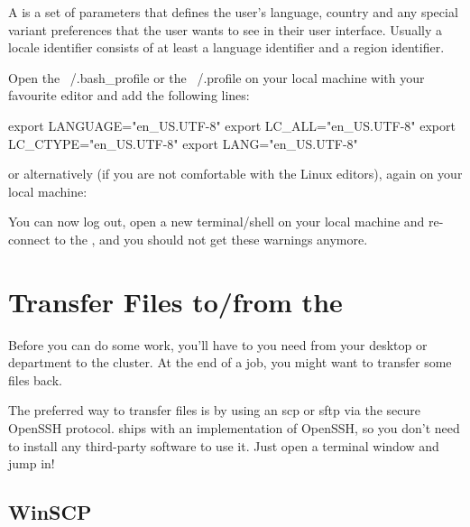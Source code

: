 A  is a set of parameters that defines the user's language,
country and any special variant preferences that the user wants to see in their
user interface. Usually a locale identifier consists of at least a language
identifier and a region identifier.

\ifmacORlinux
Open the ~/.bash\_profile or the ~/.profile on your local machine with your
favourite editor and add the following lines:

\begin{prompt}
export LANGUAGE="en_US.UTF-8"
export LC_ALL="en_US.UTF-8"
export LC_CTYPE="en_US.UTF-8"
export LANG="en_US.UTF-8"
\end{prompt}

or alternatively (if you are not comfortable with the Linux editors), again on your local machine:

\begin{prompt}
\end{prompt}

You can now log out, open a new terminal/shell on your local machine and re-connect to the \hpc, and you should not get these
warnings anymore.

\fi
\section{Transfer Files to/from the \hpc}

Before you can do some work, you'll have to 
you need from your desktop or department to the cluster. At the end of a job,
you might want to transfer some files back.

\ifmacORlinux
The preferred way to transfer files is by using an scp or sftp via the secure
OpenSSH protocol.  \OS  ships with an implementation of
OpenSSH, so you don't need to install any third-party software to use it. Just
open a terminal window and jump in!
\fi

\ifwindows
  \subsection{WinSCP}


